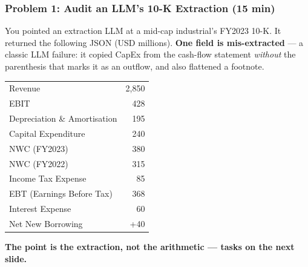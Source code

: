 \documentclass[9pt,t]{beamer}
\begin{document}
\begin{frame}
\frametitle{Problem 1: Audit an LLM's 10-K Extraction (15 min)}

You pointed an extraction LLM at a mid-cap industrial's FY2023 10-K. It returned the
following JSON (USD millions). \textbf{One field is mis-extracted} --- a classic LLM
failure: it copied CapEx from the cash-flow statement \emph{without} the parenthesis
that marks it as an outflow, and also flattened a footnote.

\begin{center}
\begin{tabular}{lr}
\toprule
Revenue & 2{,}850 \\
EBIT & 428 \\
Depreciation \& Amortisation & 195 \\
Capital Expenditure & 240 \\
NWC (FY2023) & 380 \\
NWC (FY2022) & 315 \\
Income Tax Expense & 85 \\
EBT (Earnings Before Tax) & 368 \\
Interest Expense & 60 \\
Net New Borrowing & +40 \\
\bottomrule
\end{tabular}
\end{center}

\textbf{The point is the extraction, not the arithmetic --- tasks on the next slide.}
\end{frame}
\end{document}
